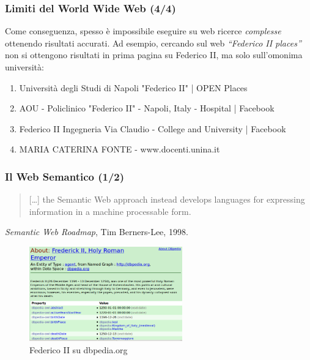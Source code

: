 \documentclass[8pt]{beamer}
\begin{document}
\begin{frame}
\frametitle{Limiti del World Wide Web (4/4)}
Come conseguenza, spesso \`e impossibile eseguire su web ricerce 
\emph{complesse} ottenendo risultati accurati. Ad esempio, cercando sul web
\emph{``Federico II places''} non si ottengono risultati in prima pagina su 
Federico II, ma solo sull'omonima universit\`a:
  
  \begin{small}
    \begin{enumerate}
   \item Universit\`a degli Studi di Napoli "Federico II" | OPEN Places
   \item AOU - Policlinico "Federico II" - Napoli, Italy - Hospital | Facebook
   \item Federico II Ingegneria Via Claudio - College and University | Facebook
   \item MARIA CATERINA FONTE - www.docenti.unina.it
  \end{enumerate}
  \end{small}
\end{frame}

\begin{frame}
\frametitle{Il Web Semantico (1/2)}
\begin{quote}
[\ldots] the Semantic Web approach instead develops languages for expressing
information in a machine processable form. 
\end{quote}
\emph{Semantic Web Roadmap}, Tim Berners-Lee, 1998.

\begin{figure}
    \includegraphics[width=250px]{federicoII_dbpedia.png} 
    \caption{Federico II su dbpedia.org}
\end{figure}
\end{frame}
\end{document}
